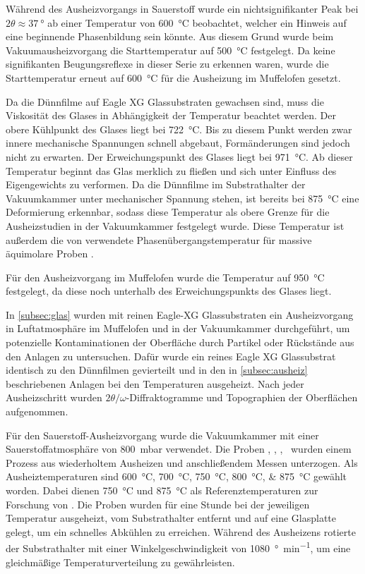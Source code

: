 Während des Ausheizvorgangs in Sauerstoff wurde ein nichtsignifikanter Peak bei ${2\theta}{\approx}\qty{37}{\degree}$
ab einer Temperatur von \qty{600}{\degreeCelsius} beobachtet, welcher ein Hinweis auf eine beginnende Phasenbildung
sein könnte.
Aus diesem Grund wurde beim Vakuumausheizvorgang die Starttemperatur auf \qty{500}{\degreeCelsius} festgelegt.
Da keine signifikanten Beugungsreflexe in dieser Serie zu erkennen waren, wurde die Starttemperatur erneut
auf \qty{600}{\degreeCelsius} für die Ausheizung im Muffelofen gesetzt.

Da die Dünnfilme auf Eagle XG Glassubstraten gewachsen sind, muss die Viskosität des Glases in Abhängigkeit der
Temperatur beachtet werden.
Der obere Kühlpunkt des Glases liegt bei \qty{722}{\degreeCelsius}.
Bis zu diesem Punkt werden zwar innere mechanische Spannungen schnell abgebaut, Formänderungen sind jedoch nicht zu
erwarten.
Der Erweichungspunkt des Glases liegt bei \qty{971}{\degreeCelsius}.
Ab dieser Temperatur beginnt das Glas merklich zu fließen und sich unter Einfluss des Eigengewichts zu verformen.
Da die Dünnfilme im Substrathalter der Vakuumkammer unter mechanischer Spannung stehen, ist bereits bei
\qty{875}{\degreeCelsius} eine Deformierung erkennbar, sodass diese Temperatur als obere Grenze für die Ausheizstudien
in der Vakuumkammer festgelegt wurde.
Diese Temperatur ist außerdem die von  verwendete Phasenübergangstemperatur für
massive äquimolare Proben \autocite{Rost2015}.

Für den Ausheizvorgang im Muffelofen wurde die Temperatur auf \qty{950}{\degreeCelsius} festgelegt, da diese noch
unterhalb des Erweichungspunkts des Glases liegt.

In \cref{subsec:glas} wurden mit reinen Eagle-XG Glassubstraten ein Ausheizvorgang in Luftatmosphäre im Muffelofen
und in der Vakuumkammer durchgeführt, um potenzielle Kontaminationen der Oberfläche durch Partikel oder Rückstände
aus den Anlagen zu untersuchen.
Dafür wurde ein reines Eagle XG Glassubstrat identisch zu den Dünnfilmen gevierteilt und in den in \cref{subsec:ausheiz}
beschriebenen Anlagen bei den Temperaturen ausgeheizt.
Nach jeder Ausheizschritt wurden $2 \theta/\omega$-Diffraktogramme und Topographien der Oberflächen aufgenommen.

Für den Sauerstoff-Ausheizvorgang wurde die Vakuumkammer mit einer Sauerstoffatmosphäre von \qty{800}{\milli\bar}
verwendet.
Die Proben \samplethree, \sampleone, \sampletwo, \samplefour\ wurden einem Prozess aus wiederholtem Ausheizen und
anschließendem Messen unterzogen.
Als Ausheiztemperaturen sind \qtylist{600;700;750;800;875}{\degreeCelsius} gewählt worden.
Dabei dienen \qty{750}{\degreeCelsius} und \qty{875}{\degreeCelsius} als Referenztemperaturen zur Forschung
von  \autocite{Rost2015}.
Die Proben wurden für eine Stunde bei der jeweiligen Temperatur ausgeheizt, vom Substrathalter entfernt und auf eine
Glasplatte gelegt, um ein schnelles Abkühlen zu erreichen.
Während des Ausheizens rotierte der Substrathalter mit einer Winkelgeschwindigkeit von
\qty{1080}{\degree\per\minute}, um eine
gleichmäßige Temperaturverteilung zu gewährleisten.

